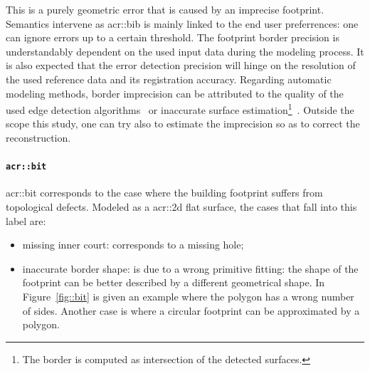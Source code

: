                 This is a purely geometric error that is caused by an imprecise footprint.
                Semantics intervene as \gls{acr::bib} is mainly linked to the end user preferrences: one can ignore errors up to a certain threshold. 
                The footprint border precision is understandably dependent on the used input data during the modeling process.
                It is also expected that the error detection precision will hinge on the resolution of the used reference data and its registration accuracy.
                Regarding automatic modeling methods, border imprecision can be attributed to the quality of the used edge detection algorithms~\parencite{nan2015template,baillard1999automatic,werner2002new} or inaccurate surface estimation\footnote{
                    The border is computed as intersection of the detected surfaces.
                }~\parencite{durupt2006automatic,xiong2014graph}.
                Outside the scope this study, one can try also to estimate the imprecision so as to correct the reconstruction.

            \paragraph{\texttt{\acrlong*{acr::bit}}}
                \gls{acr::bit} corresponds to the case where the building footprint suffers from topological defects.
                Modeled as a \gls{acr::2d} flat surface, the cases that fall into this label are:
                \begin{itemize}
                    \item missing inner court: corresponds to a missing hole;
                    \item inaccurate border shape:  is due to a wrong primitive fitting: the shape of the footprint can be better described by a different geometrical shape.
                            In Figure~\ref{fig::bit} is given an example where the polygon has a wrong number of sides.
                            Another case is where a circular footprint can be approximated by a polygon.
                \end{itemize}

